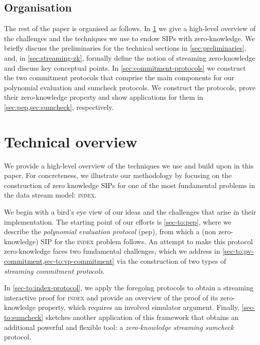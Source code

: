 \documentclass[10pt,a4paper]{article}
\theoremstyle{definition}
\newcommand{\indexproblem}{\normalfont\textsc{index}\xspace}
\newcommand{\pepprotocol}{\textsf{pep}\xspace}
\begin{document}
\subsection*{Organisation}
    
    The rest of the paper is organised as follows. In \cref{sec:technical-overview} we give a high-level overview of the challenges and the techniques we use to endow SIPs with zero-knowledge. We briefly discuss the preliminaries for the technical sections in \cref{sec:preliminaries}, and, in \cref{sec:streaming-zk}, formally define the notion of streaming zero-knowledge and discuss key conceptual points. In \cref{sec:commitment-protocols} we construct the two commitment protocols that comprise the main components for our polynomial evaluation and sumcheck protocols. We construct the protocols, prove their zero-knowledge property and show applications for them in \cref{sec:pep,sec:sumcheck}, respectively.

\section{Technical overview}
    \label{sec:technical-overview}
    
    We provide a high-level overview of the techniques we use and build upon in this paper. For concreteness, we illustrate our methodology by focusing on the construction of zero knowledge SIPs for one of the most fundamental problems in the data stream model: \indexproblem.
    
    We begin with a bird's eye view of our ideas and the challenges that arise in their implementation. The starting point of our efforts is \cref{sec-to:pep}, where we describe the \emph{polynomial evaluation protocol} (\pepprotocol), from which a (non zero-knowledge) SIP for the \indexproblem problem follows.
    An attempt to make this protocol zero-knowledge faces two fundamental challenges, which we address in \cref{sec-to:pv-commitment,sec-to:vp-commitment} via the construction of two types of \emph{streaming commitment protocols}.
    
    In \cref{sec-to:index-protocol}, we apply the foregoing protocols to obtain a streaming interactive proof for \indexproblem and provide an overview of the proof of its zero-knowledge property, which requires an involved simulator argument. Finally, \cref{sec-to:sumcheck} sketches another application of this framework that obtains an additional powerful and flexible tool: a \emph{zero-knowledge streaming sumcheck} protocol.
    
\end{document}
